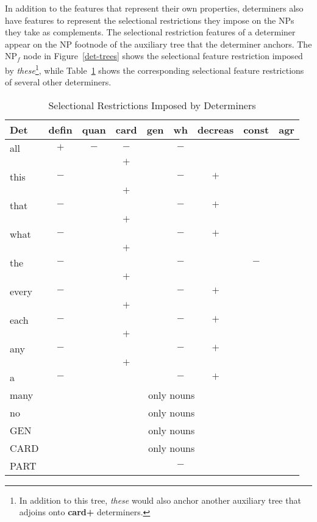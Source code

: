 \normalsize

In addition to the features that represent their own properties, determiners
also have features to represent the selectional
restrictions they impose on the NPs they take as complements.  The
selectional restriction features of a determiner appear on the NP footnode of
the auxiliary tree that the determiner anchors.  The NP$_{f}$ node in Figure~\ref{det-trees} shows the selectional feature
restriction imposed by {\it these}\footnote{In addition to this tree, {\it
these} would also anchor another auxiliary tree that adjoins onto {\bf card+}
determiners.}, while Table~\ref{det-ordering} shows the corresponding
selectional feature restrictions of several other determiners.

\small
\begin{table}
\centering
\begin{tabular}{|l||c|c|c|c|c|c|c|c|}
\hline
Det&defin&quan&card&gen&wh&decreas&const&agr\\
\hline
\hline
all&$+$&$-$&$-$&&$-$&&&\\
&&&$+$&&&&&\\
this&$-$&&&&$-$&$+$&&\\
&&&$+$&&&&&\\
that&$-$&&&&$-$&$+$&&\\
&&&$+$&&&&&\\
what&$-$&&&&$-$&$+$&&\\
&&&$+$&&&&&\\
the&$-$&&&&$-$&&$-$&\\
&&&$+$&&&&&\\
every&$-$&&&&$-$&$+$&&\\
&&&$+$&&&&&\\
each&$-$&&&&$-$&$+$&&\\
&&&$+$&&&&&\\
any&$-$&&&&$-$&$+$&&\\
&&&$+$&&&&&\\
a&$-$&&&&$-$&$+$&&\\
many&\multicolumn{8}{c|}{only nouns}\\
no&\multicolumn{8}{c|}{only nouns}\\
GEN&\multicolumn{8}{c|}{only nouns}\\
CARD&\multicolumn{8}{c|}{only nouns}\\
PART&&&&&$-$&&&\\
\hline
\end{tabular}
\caption{Selectional Restrictions Imposed by Determiners}
\label{det-ordering}
\end{table}

